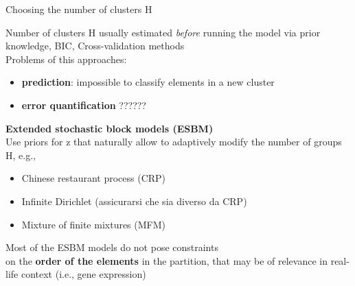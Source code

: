 \begin{frame}{Choosing the number of clusters H}

Number of clusters H usually estimated \textit{before} running the model via prior knowledge, BIC, Cross-validation methods\\
Problems of this approaches: 
\begin{itemize}
    \item\textbf{prediction}: impossible to classify elements in a new cluster
    \item \textbf{error quantification} ??????
\end{itemize}
\hline 
\textbf{\alert{Extended stochastic block models (ESBM)}}\\  
Use priors for z that naturally allow to adaptively modify the number of groups H, e.g., 
\begin{itemize}
    \item Chinese restaurant process (CRP)
    \item Infinite Dirichlet (assicurarsi che sia diverso da CRP)
    \item Mixture of finite mixtures (MFM)\\
\end{itemize}

\centering
Most of the ESBM models do not pose constraints\\ on the \textbf{order of the elements} in the partition, that may be of relevance in real-life context (i.e., gene expression)
\end{frame}








